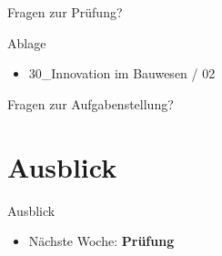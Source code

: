 \begin{frame}{Fragen zur Prüfung?}

\end{frame}

%
%





\begin{frame}{Ablage}
\begin{itemize}
	\item 30\_Innovation im Bauwesen / 02 
\end{itemize}
\end{frame}

\begin{frame}{Fragen zur Aufgabenstellung?}

\end{frame}




\section{Ausblick}
\BlueSectionSlide
{}
\begin{frame}{Ausblick}
	\begin{itemize}
		\item[\textbullet] Nächste Woche: \textbf{Prüfung}
	\end{itemize}
\end{frame}




